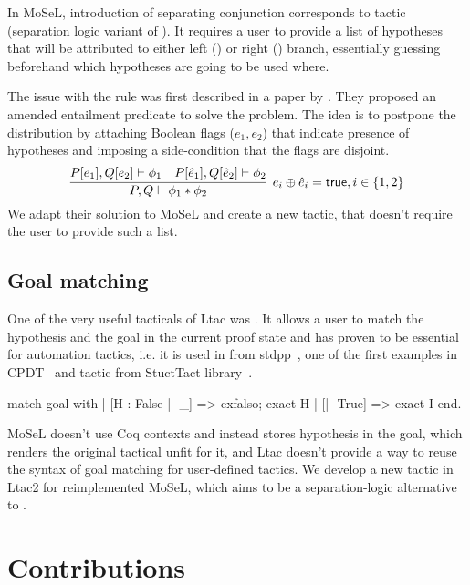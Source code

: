 In MoSeL, introduction of separating conjunction corresponds to  tactic (separation logic variant of ).
It requires a user to provide a list of hypotheses that will be attributed to either left () or right () branch, essentially guessing beforehand which hypotheses are going to be used where.

The issue with the rule was first described in a paper by \citet{harlandResourceDistributionBooleanConstraints2003}.
They proposed an amended entailment predicate to solve the problem.
The idea is to postpone the distribution by attaching Boolean flags (\(e_1, e_2\)) that indicate presence of hypotheses and imposing a side-condition that the flags are disjoint.
\[\infer[e_i \oplus \hat{e}_i = \true, i \in \{1,2\}]
        {P, Q \vdash \phi_1 \ast \phi_2}
        {P[e_1], Q[e_2] \vdash \phi_1 &
         P[\hat{e}_1], Q[\hat{e}_2] \vdash \phi_2} \]
We adapt their solution to MoSeL and create a new  tactic, that doesn't require the user to provide such a list.

\subsection{Goal matching}
\label{sec:goal-matching}

One of the very useful tacticals of Ltac was .
It allows a user to match the hypothesis and the goal in the current proof state and has proven to be essential for automation tactics, i.e. it is used in  from stdpp~\cite{ProjectsIrisStdpp}, one of the first examples in CPDT~\cite{chlipalaCertifiedProgrammingDependent2013} and  tactic from StuctTact library~\cite{UwplseStructTact2020}.
\begin{coq}
match goal with
| [H : False |- _] => exfalso; exact H
| [|- True] => exact I
end.
\end{coq}

MoSeL doesn't use Coq contexts and instead stores hypothesis in the goal, which renders the original tactical unfit for it, and Ltac doesn't provide a way to reuse the syntax of goal matching for user-defined tactics.
We develop a new tactic  in Ltac2 for reimplemented MoSeL, which aims to be a separation-logic alternative to .
  
\section{Contributions}
\label{sec:contributions}

